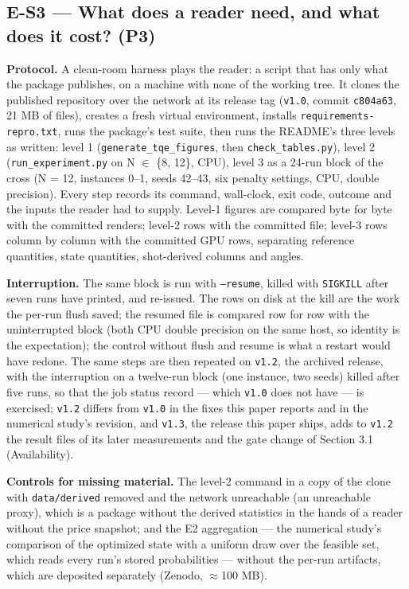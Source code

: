 \documentclass[acmsmall,screen,review]{acmart}
\begin{document}
\subsection{E-S3 --- What does a reader need, and what does it cost? (P3)}

\textbf{Protocol.} A clean-room harness plays the reader: a script that has only what the package publishes, on a machine with none of the working tree. It clones the published repository over the network at its release tag (\texttt{v1.0}, commit \texttt{c804a63}, 21 MB of files), creates a fresh virtual environment, installs \texttt{requirements-\allowbreak{}repro.\allowbreak{}txt}, runs the package's test suite, then runs the README's three levels as written: level 1 (\texttt{generate\_\allowbreak{}tqe\_\allowbreak{}figures}, then \texttt{check\_tables.py}), level 2 (\texttt{run\_\allowbreak{}experiment.\allowbreak{}py} on N $\in$ \{8, 12\}, CPU), level 3 as a 24-run block of the cross (N = 12, instances 0--1, seeds 42--43, six penalty settings, CPU, double precision). Every step records its command, wall-clock, exit code, outcome and the inputs the reader had to supply. Level-1 figures are compared byte for byte with the committed renders; level-2 rows with the committed file; level-3 rows column by column with the committed GPU rows, separating reference quantities, state quantities, shot-derived columns and angles.


\textbf{Interruption.} The same block is run with \texttt{--resume}, killed with \texttt{SIGKILL} after seven runs have printed, and re-issued. The rows on disk at the kill are the work the per-run flush saved; the resumed file is compared row for row with the uninterrupted block (both CPU double precision on the same host, so identity is the expectation); the control without flush and resume is what a restart would have redone. The same steps are then repeated on \texttt{v1.2}, the archived release, with the interruption on a twelve-run block (one instance, two seeds) killed after five runs, so that the job status record --- which \texttt{v1.0} does not have --- is exercised; \texttt{v1.2} differs from \texttt{v1.0} in the fixes this paper reports and in the numerical study's revision, and \texttt{v1.3}, the release this paper ships, adds to \texttt{v1.2} the result files of its later measurements and the gate change of Section 3.1 (Availability).


\textbf{Controls for missing material.} The level-2 command in a copy of the clone with \texttt{data/derived} removed and the network unreachable (an unreachable proxy), which is a package without the derived statistics in the hands of a reader without the price snapshot; and the E2 aggregation --- the numerical study's comparison of the optimized state with a uniform draw over the feasible set, which reads every run's stored probabilities --- without the per-run artifacts, which are deposited separately (Zenodo, $\approx$100 MB).
\end{document}
